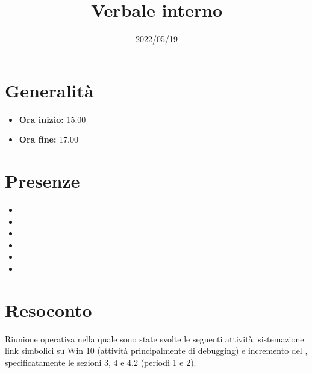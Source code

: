 \documentclass{classes/base}
\title{Verbale interno}
\date{2022/05/19}
\author{\marcob}
\renewcommand{\maketitle}{
    
}
\begin{document}
    \maketitle

    \section*{Generalità}
    \begin{itemize}
        \item \textbf{Ora inizio:} 15.00
        \item \textbf{Ora fine:} 17.00
    \end{itemize}

    \section*{Presenze}
    \begin{itemize}
     	\item \angela
      	\item \marcob
        \item \tommaso
        \item \ruth
        \item \marcov
        \item \giulio
    \end{itemize}

    \section*{Resoconto}
    Riunione operativa nella quale sono state svolte le seguenti attività: sistemazione link simbolici 
    su Win 10 (attività principalmente di debugging) e incremento del \PdP, specificatamente le sezioni
    3, 4 e 4.2 (periodi 1 e 2). 
\end{document}
